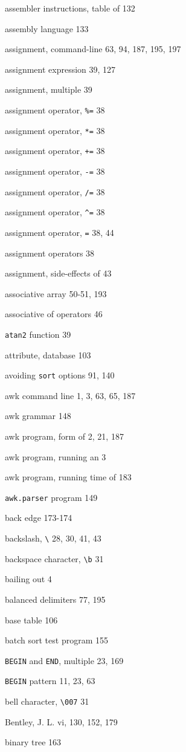 \begin{multicols}{2}
assembler instructions, table of 132

assembly language 133

assignment, command-line 63, 94, 187, 195, 197

assignment expression 39, 127

assignment, multiple 39

assignment operator, \verb'%=' 38

assignment operator, \verb'*=' 38

assignment operator, \verb'+=' 38

assignment operator, \verb'-=' 38

assignment operator, \verb'/=' 38

assignment operator, \verb'^=' 38

assignment operator, \verb'=' 38, 44

assignment operators 38

assignment, side-effects of 43

associative array 50-51, 193

associative of operators 46

\verb'atan2' function 39

attribute, database 103

avoiding \verb'sort' options 91, 140

awk command line 1, 3, 63, 65, 187

awk grammar 148

awk program, form of 2, 21, 187

awk program, running an 3

awk program, running time of 183

\verb'awk.parser' program 149

back edge 173-174

backslash, \verb'\' 28, 30, 41, 43

backspace character, \verb'\b' 31

bailing out 4

balanced delimiters 77, 195

base table 106

batch sort test program 155

\verb'BEGIN' and \verb'END', multiple 23, 169

\verb'BEGIN' pattern 11, 23, 63

bell character, \verb'\007' 31

Bentley, J. L. vi, 130, 152, 179

binary tree 163


\end{multicols}
